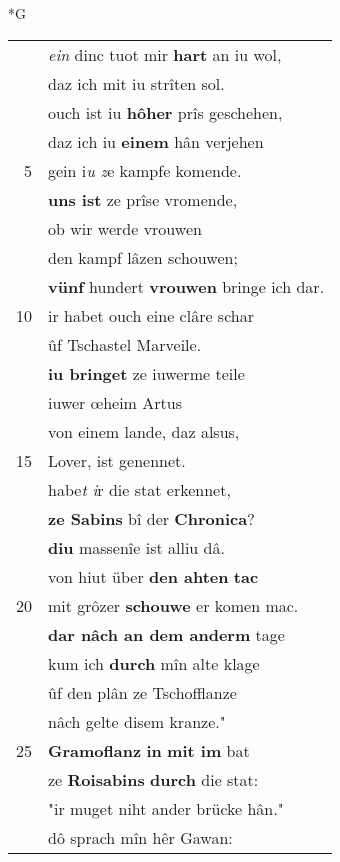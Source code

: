 \documentclass[8pt,a4paper,notitlepage]{article}
\begin{document}
\newpage
\begin{table}[ht]
\begin{minipage}[t]{0.5\linewidth}
\small
\begin{center}*G
\end{center}
\begin{tabular}{rl}
 & \textit{ein} dinc tuot mir \textbf{hart} an iu wol,\\ 
 & daz ich mit iu strîten sol.\\ 
 & ouch ist iu \textbf{hôher} prîs geschehen,\\ 
 & daz ich iu \textbf{einem} hân verjehen\\ 
5 & gein i\textit{u z}e kampfe komende.\\ 
 & \textbf{uns ist} ze prîse vromende,\\ 
 & ob wir werde vrouwen\\ 
 & den kampf lâzen schouwen;\\ 
 & \textbf{vünf} hundert \textbf{vrouwen} bringe ich dar.\\ 
10 & ir habet ouch eine clâre schar\\ 
 & ûf Tschastel Marveile.\\ 
 & \textbf{iu bringet} ze iuwerme teile\\ 
 & iuwer œheim Artus\\ 
 & von einem lande, daz alsus,\\ 
15 & Lover, ist genennet.\\ 
 & habe\textit{t i}r die stat erkennet,\\ 
 & \textbf{ze Sabins} bî der \textbf{Chronica}?\\ 
 & \textbf{diu} massenîe ist alliu dâ.\\ 
 & von hiut über \textbf{den ahten} \textbf{tac}\\ 
20 & mit grôzer \textbf{schouwe} er komen mac.\\ 
 & \textbf{dar nâch an dem anderm} tage\\ 
 & kum ich \textbf{durch} mîn alte klage\\ 
 & ûf den plân ze Tschofflanze\\ 
 & nâch gelte disem kranze."\\ 
25 & \textbf{Gramoflanz} \textbf{in} \textbf{mit im} bat\\ 
 & ze \textbf{Roisabins} \textbf{durch} die stat:\\ 
 & "ir muget niht ander brücke hân."\\ 
 & dô sprach mîn hêr Gawan:\\ 

\end{tabular}
\end{minipage}
\end{table}
\end{document}
